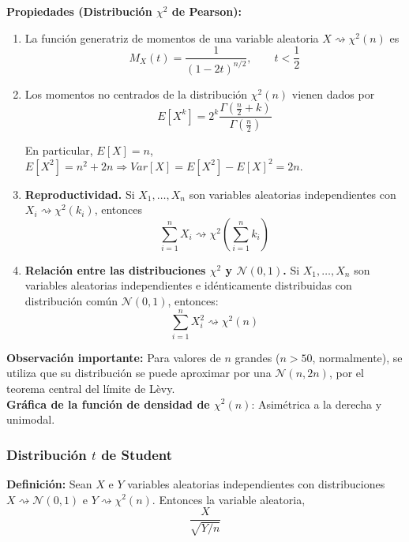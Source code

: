 \documentclass{article}
\begin{document}
\textbf{Propiedades (Distribución $\chi^2$ de Pearson):} 
\begin{enumerate}
\item La función generatriz de momentos de una variable aleatoria $X\rightsquigarrow \chi^2(n)$ es
\begin{equation*}
M_X(t)=\frac{1}{(1-2t)^{n/2}},\qquad t<\frac{1}{2}
\end{equation*}

\item Los momentos no centrados de la distribución $\chi^2(n)$ vienen dados por
\begin{equation*}
E[X^k]=2^k\frac{\Gamma(\frac{n}{2}+k)}{\Gamma(\frac{n}{2})}
\end{equation*}

En particular, $E[X]=n$, $E[X^2]=n^2+2n\Rightarrow Var[X]=E[X^2]-E[X]^2=2n$.

\item \textbf{Reproductividad.} Si $X_1,\ldots,X_n$ son variables aleatorias independientes con $X_i\rightsquigarrow \chi^2(k_i)$, entonces
\begin{equation*}
\sum_{i=1}^n X_i\rightsquigarrow \chi^2\left(\sum_{i=1}^n k_i\right)
\end{equation*}

\item \textbf{Relación entre las distribuciones $\chi^2$ y $\mathcal{N}(0,1)$.} Si $X_1,\ldots,X_n$ son variables aleatorias independientes e idénticamente distribuidas con distribución común $\mathcal{N}(0,1)$, entonces:
\begin{equation*}
\sum_{i=1}^n X_i^2\rightsquigarrow \chi^2(n)
\end{equation*}
\end{enumerate}

\textbf{Observación importante:} Para valores de $n$ grandes ($n>50$, normalmente), se utiliza que su distribución se puede aproximar por una $\mathcal{N}(n,2n)$, por el teorema central del límite de Lèvy. \\

\textbf{Gráfica de la función de densidad de $\chi^2(n)$}: Asimétrica a la derecha y unimodal.

\subsubsection{Distribución $t$ de Student}
\textbf{Definición:} Sean $X$ e $Y$ variables aleatorias independientes con distribuciones $X\rightsquigarrow \mathcal{N}(0,1)$ e $Y\rightsquigarrow \chi^2(n)$. Entonces la variable aleatoria,
\begin{equation*}
\frac{X}{\sqrt{Y/n}}
\end{equation*}
\end{document}
